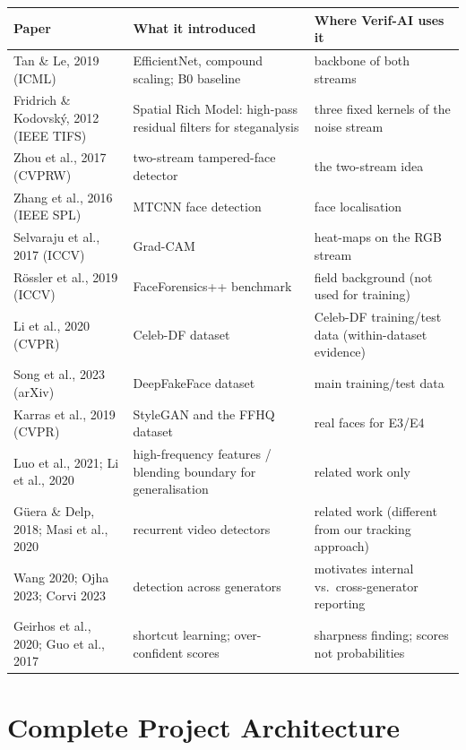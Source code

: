 \documentclass[11pt,a4paper]{report}
\begin{document}
\begin{center}
\footnotesize
\begin{tabular}{|L{3.6cm}|L{6.6cm}|L{4.6cm}|}
\hline
\textbf{Paper} & \textbf{What it introduced} & \textbf{Where Verif-AI uses it}\\\hline
Tan \& Le, 2019 (ICML) & EfficientNet, compound scaling; B0 baseline & backbone of both streams\\\hline
Fridrich \& Kodovsk\'y, 2012 (IEEE TIFS) & Spatial Rich Model: high-pass residual filters for steganalysis & three fixed kernels of the noise stream\\\hline
Zhou et al., 2017 (CVPRW) & two-stream tampered-face detector & the two-stream idea\\\hline
Zhang et al., 2016 (IEEE SPL) & MTCNN face detection & face localisation\\\hline
Selvaraju et al., 2017 (ICCV) & Grad-CAM & heat-maps on the RGB stream\\\hline
R\"ossler et al., 2019 (ICCV) & FaceForensics++ benchmark & field background (not used for training)\\\hline
Li et al., 2020 (CVPR) & Celeb-DF dataset & Celeb-DF training/test data (within-dataset evidence)\\\hline
Song et al., 2023 (arXiv) & DeepFakeFace dataset & main training/test data\\\hline
Karras et al., 2019 (CVPR) & StyleGAN and the FFHQ dataset & real faces for E3/E4\\\hline
Luo et al., 2021; Li et al., 2020 & high-frequency features / blending boundary for generalisation & related work only\\\hline
G\"uera \& Delp, 2018; Masi et al., 2020 & recurrent video detectors & related work (different from our tracking approach)\\\hline
Wang 2020; Ojha 2023; Corvi 2023 & detection across generators & motivates internal vs.\ cross-generator reporting\\\hline
Geirhos et al., 2020; Guo et al., 2017 & shortcut learning; over-confident scores & sharpness finding; scores not probabilities\\\hline
\end{tabular}
\end{center}

\chapter{Complete Project Architecture}
\end{document}
